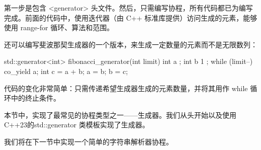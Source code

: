 第一步是包含 <generator> 头文件。然后，只需编写协程，所有代码都已为编写完成。前面的代码中，使用迭代器（由 C++ 标准库提供）访问生成的元素，能够使用 range-for 循环、算法和范围。

还可以编写斐波那契生成器的一个版本，来生成一定数量的元素而不是无限数列：

\begin{cpp}
std::generator<int> fibonacci_generator(int limit) {
    int a{ };
    int b{ 1 };
    while (limit--) {
        co_yield a;
        int c = a + b;
        a = b;
        b = c;
    }
}
\end{cpp}

代码的变化非常简单：只需传递希望生成器生成的元素数量，并将其用作 while 循环中的终止条件。

本节中，实现了最常见的协程类型之一——生成器。我们从头开始以及使用 C++23的std::generator 类模板实现了生成器。

我们将在下一节中实现一个简单的字符串解析器协程。










